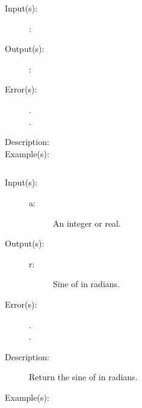 \begin{description}
\begin{description}
\begin{verbatim}
		\end{verbatim}
	\end{description}
\label{systemdict:sigwait}
\item[{\onyxop{OPARGS}{sigwait}{OPOUTS}}: ]
	\begin{description}\item[]
	\item[Input(s): ]
		\begin{description}\item[]
		\item[: ]
		\end{description}
	\item[Output(s): ]
		\begin{description}\item[]
		\item[: ]
		\end{description}
	\item[Error(s): ]
		\begin{description}\item[]
		\item[.]
		\item[.]
		\end{description}
	\item[Description: ]
	\item[Example(s): ]\begin{verbatim}

		\end{verbatim}
	\end{description}
\label{systemdict:sin}
\item[{\onyxop{a}{sin}{r}}: ]
	\begin{description}\item[]
	\item[Input(s): ]
		\begin{description}\item[]
		\item[a: ]
			An integer or real.
		\end{description}
	\item[Output(s): ]
		\begin{description}\item[]
		\item[r: ]
			Sine of  in radians.
		\end{description}
	\item[Error(s): ]
		\begin{description}\item[]
		\item[.]
		\item[.]
		\end{description}
	\item[Description: ]
		Return the sine of  in radians.
	\item[Example(s): ]\begin{verbatim}


\end{verbatim}
\end{description}
\end{description}
